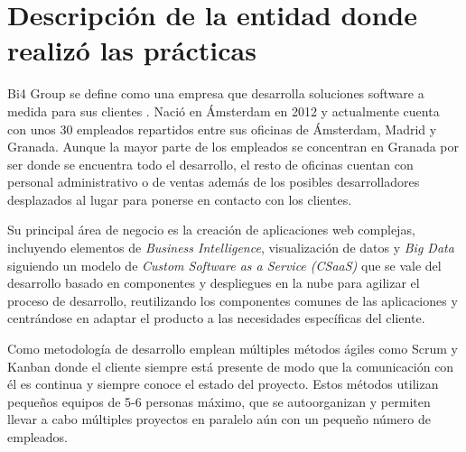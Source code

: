 \chapter{Descripción de la entidad donde realizó las prácticas}

Bi4 Group se define como una empresa que desarrolla soluciones software a medida para sus clientes \cite{bi4_about_us}. Nació en Ámsterdam en 2012 y actualmente cuenta con unos 30 empleados repartidos entre sus oficinas de Ámsterdam, Madrid y Granada. Aunque la mayor parte de los empleados se concentran en Granada por ser donde se encuentra todo el desarrollo, el resto de oficinas cuentan con personal administrativo o de ventas además de los posibles desarrolladores desplazados al lugar para ponerse en contacto con los clientes. 

Su principal área de negocio es la creación de aplicaciones web complejas, incluyendo elementos de \textit{Business Intelligence}, visualización de datos y \textit{Big Data} siguiendo un modelo de \textit{Custom Software as a Service (CSaaS)} que se vale del desarrollo basado en componentes y despliegues en la nube para agilizar el proceso de desarrollo, reutilizando los componentes comunes de las aplicaciones y centrándose en adaptar el producto a las necesidades específicas del cliente.

Como metodología de desarrollo emplean múltiples métodos ágiles como Scrum y Kanban donde el cliente siempre está presente de modo que la comunicación con él es continua y siempre conoce el estado del proyecto. Estos métodos utilizan pequeños equipos de 5-6 personas máximo, que se autoorganizan y permiten llevar a cabo múltiples proyectos en paralelo aún con un pequeño número de empleados.

